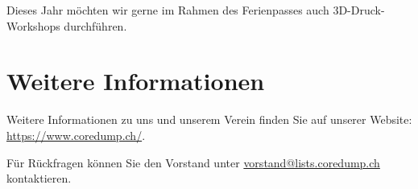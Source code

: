 \documentclass[10pt,a4paper,parskip,fleqn]{scrartcl}
\begin{document}
Dieses Jahr möchten wir gerne im Rahmen des Ferienpasses auch 3D-Druck-Workshops
durchführen.

\section{Weitere Informationen}

Weitere Informationen zu uns und unserem Verein finden Sie auf unserer
Website:\\\url{https://www.coredump.ch/}.

Für Rückfragen können Sie den Vorstand unter \url{vorstand@lists.coredump.ch}
kontaktieren.


% 
% 

% 
% 
% 
\end{document}
